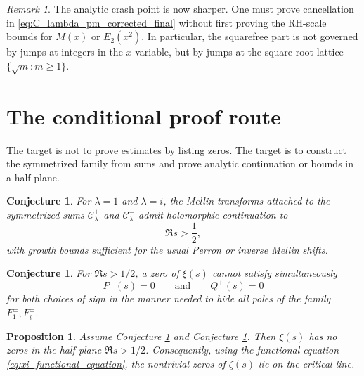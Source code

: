 \documentclass[11pt]{amsart}
\numberwithin{equation}{section}
\theoremstyle{plain}
\newtheorem{proposition}[theorem]{Proposition}
\newtheorem{conjecture}[theorem]{Conjecture}
\theoremstyle{definition}
\theoremstyle{remark}
\newtheorem{remark}[theorem]{Remark}
\begin{document}
\begin{remark}
\label{rem:corrected_crash_point}
The analytic crash point is now sharper.  One must prove cancellation in \eqref{eq:C_lambda_pm_corrected_final} without first proving the RH-scale bounds for \(M(x)\) or \(E_2(x^2)\).  In particular, the squarefree part is not governed by jumps at integers in the \(x\)-variable, but by jumps at the square-root lattice \(\{\sqrt m:m\ge1\}\).
\end{remark}

\section{The conditional proof route}
\label{sec:conditional_proof_route}

The target is not to prove estimates by listing zeros.  The target is to construct the symmetrized family from sums and prove analytic continuation or bounds in a half-plane.

\begin{conjecture}
\label{conj:mellin_symmetrized_continuation}
For \(\lambda=1\) and \(\lambda=i\), the Mellin transforms attached to the symmetrized sums \(\mathcal C_\lambda^+\) and \(\mathcal C_\lambda^-\) admit holomorphic continuation to
\begin{equation}
\Re s>\frac12,
\label{eq:target_half_plane}
\end{equation}
with growth bounds sufficient for the usual Perron or inverse Mellin shifts.
\end{conjecture}

\begin{conjecture}
\label{conj:no_simultaneous_numerator_cancellation}
For \(\Re s>1/2\), a zero of \(\xi(s)\) cannot satisfy simultaneously
\begin{equation}
P^{\pm}(s)=0
\qquad\text{and}\qquad
Q^{\pm}(s)=0
\label{eq:no_simultaneous_PQ_cancellation}
\end{equation}
for both choices of sign in the manner needed to hide all poles of the family \(F_1^{\pm},F_i^{\pm}\).
\end{conjecture}

\begin{proposition}
\label{prop:conditional_route_to_RH}
Assume Conjecture \ref{conj:mellin_symmetrized_continuation} and Conjecture \ref{conj:no_simultaneous_numerator_cancellation}.  Then \(\xi(s)\) has no zeros in the half-plane \(\Re s>1/2\).  Consequently, using the functional equation \eqref{eq:xi_functional_equation}, the nontrivial zeros of \(\zeta(s)\) lie on the critical line.
\end{proposition}
\end{document}
